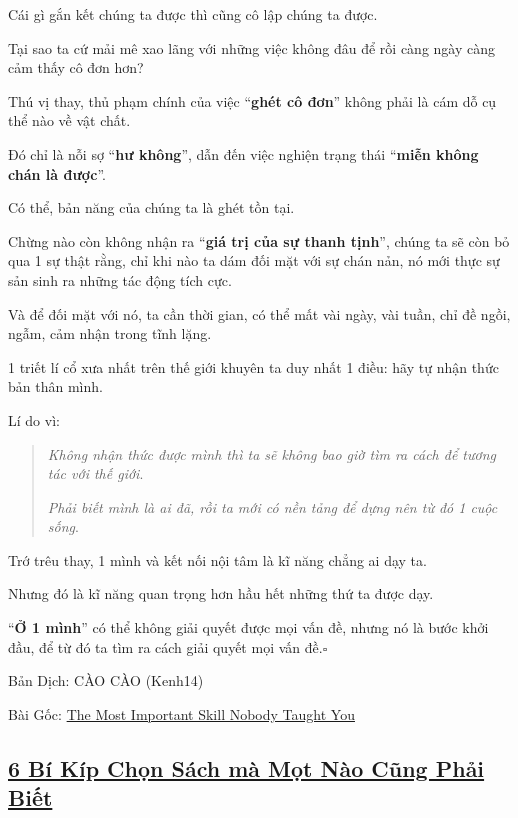\documentclass{article}
\begin{document}
%
Cái gì gắn kết chúng ta được thì cũng cô lập chúng ta được.

Tại sao ta cứ mải mê xao lãng với những việc không đâu để rồi càng ngày càng cảm thấy cô đơn hơn?

%
Thú vị thay, thủ phạm chính của việc ``\textbf{ghét cô đơn}'' không phải là cám dỗ cụ thể nào về vật chất.

Đó chỉ là nỗi sợ ``\textbf{hư không}'', dẫn đến việc nghiện trạng thái ``\textbf{miễn không chán là được}''.

Có thể, bản năng của chúng ta là ghét tồn tại.

%
Chừng nào còn không nhận ra ``\textbf{giá trị của sự thanh tịnh}'', chúng ta sẽ còn bỏ qua 1 sự thật rằng, chỉ khi nào ta dám đối mặt với sự chán nản, nó mới thực sự sản sinh ra những tác động tích cực.

Và để đối mặt với nó, ta cần thời gian, có thể mất vài ngày, vài tuần, chỉ đề ngồi, ngẫm, cảm nhận trong tĩnh lặng.

%
1 triết lí cổ xưa nhất trên thế giới khuyên ta duy nhất 1 điều: hãy tự nhận thức bản thân mình.

Lí do vì:

\begin{quotation}
	\textit{Không nhận thức được mình thì ta sẽ không bao giờ tìm ra cách để tương tác với thế giới}.
	
	\textit{Phải biết mình là ai đã, rồi ta mới có nền tảng để dựng nên từ đó 1 cuộc sống}.
\end{quotation}
Trớ trêu thay, 1 mình và kết nối nội tâm là kĩ năng chẳng ai dạy ta.

Nhưng đó là kĩ năng quan trọng hơn hầu hết những thứ ta được dạy.

%
``\textbf{Ở 1 mình}'' có thể không giải quyết được mọi vấn đề, nhưng nó là bước khởi đầu, để từ đó ta tìm ra cách giải quyết mọi vấn đề.\hfill$\square$

\begin{flushright}
	Bản Dịch: CÀO CÀO (Kenh14)
	
	Bài Gốc: \href{https://medium.com/personal-growth/the-most-important-skill-nobody-taught-you-9b162377ab77}{The Most Important Skill Nobody Taught You}
\end{flushright}


\subsection{\href{http://tramdoc.vn/tin-tuc/sau-bi-kip-chon-sach-ma-mot-nao-cung-phai-biet-nVoMW.html}{6 Bí Kíp Chọn Sách mà Mọt Nào Cũng Phải Biết}}
\end{document}
